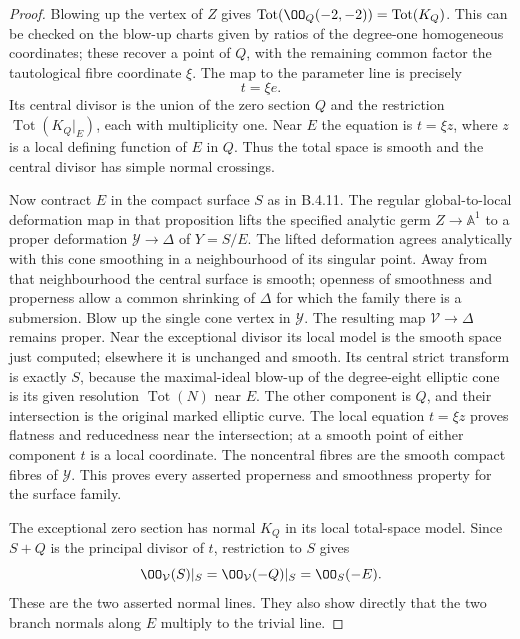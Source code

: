 \begin{proof}
Blowing up the vertex of $Z$ gives
$\operatorname{Tot}(\OO_Q(-2,-2))=\operatorname{Tot}(K_Q)$.
This can be checked on the blow-up charts given by ratios of the
degree-one homogeneous coordinates; these recover a point of
$Q$, with the remaining common factor the tautological fibre
coordinate $\xi$.
The map to the parameter line is precisely
\[
 t=\xi e.
\]
Its central divisor is the union of the zero section $Q$ and
the restriction $\operatorname{Tot}(K_Q|_E)$, each with
multiplicity one.  Near $E$ the equation is $t=\xi z$, where
$z$ is a local defining function of $E$ in $Q$.
Thus the total space is smooth and the central divisor has
simple normal crossings.

Now contract $E$ in the compact surface $S$ as in B.4.11.
The regular global-to-local deformation map in that proposition
lifts the specified analytic germ $Z\to\mathbb A^1$ to a proper
deformation $\mathcal Y\to\Delta$ of $Y=S/E$.
The lifted deformation agrees analytically with this cone
smoothing in a neighbourhood of its singular point.
Away from that neighbourhood the central surface is smooth;
openness of smoothness and properness allow a common shrinking
of $\Delta$ for which the family there is a submersion.
Blow up the single cone vertex in $\mathcal Y$.
The resulting map $\mathcal V\to\Delta$ remains proper.
Near the exceptional divisor its local model is the smooth
space just computed; elsewhere it is unchanged and smooth.
Its central strict transform is exactly $S$, because the
maximal-ideal blow-up of the degree-eight elliptic cone is its
given resolution $\operatorname{Tot}(N)$ near $E$.
The other component is $Q$, and their intersection is the original
marked elliptic curve.  The local equation $t=\xi z$ proves
flatness and reducedness near the intersection; at a smooth
point of either component $t$ is a local coordinate.
The noncentral fibres are the smooth compact fibres of
$\mathcal Y$.
This proves every asserted properness and smoothness property
for the surface family.

The exceptional zero section has normal $K_Q$ in its local
total-space model.  Since $S+Q$ is the principal divisor of $t$,
restriction to $S$ gives
\[
 \OO_{\mathcal V}(S)|_S
   =\OO_{\mathcal V}(-Q)|_S=\OO_S(-E).
\]
These are the two asserted normal lines.  They also show directly
that the two branch normals along $E$ multiply to the trivial line.


\end{proof}
